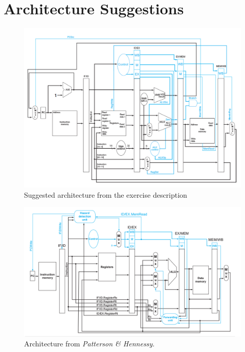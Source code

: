 \chapter{Architecture Suggestions}
\label{app:architecture}

\begin{figure}[h]
    \centering
    \includegraphics[width=\textwidth]{img/suggested_architecture}
    \caption{
      Suggested architecture from the exercise description\cite[Section 5.2]{bib:compendium}
    }
    \label{fig:suggested_architecture}
\end{figure}

\begin{figure}[h]
    \centering
    \includegraphics[width=\textwidth]{img/book_architecture}
    \caption{
        Architecture from \textit{Patterson \& Hennessy}\cite[Chapter 4.7]{bib:patt-henn}.
    }
    \label{fig:book_architecture}
\end{figure}

